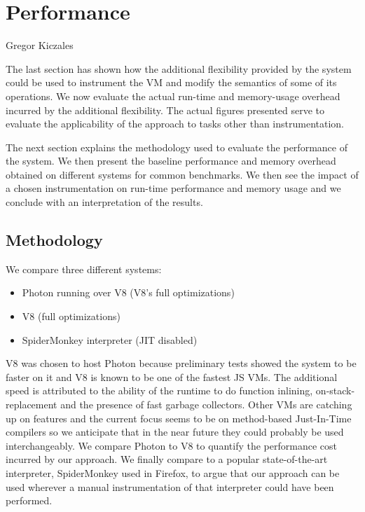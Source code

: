 \chapter{Performance}
{Gregor Kiczales~\cite{Kiczales92towardsa}}

\label{chap:Performance}

The last section has shown how the additional flexibility provided by the
system could be used to instrument the VM and modify the semantics of some of
its operations. We now evaluate the actual run-time and memory-usage overhead
incurred by the additional flexibility. The actual figures presented serve to
evaluate the applicability of the approach to tasks other than instrumentation.

The next section explains the methodology used to evaluate the performance of
the system. We then present the baseline performance and memory overhead
obtained on different systems for common benchmarks. We then see the impact of
a chosen instrumentation on run-time performance and memory usage and we
conclude with an interpretation of the results. 

\section{Methodology}

We compare three different systems:
\begin{itemize}
    \item Photon running over V8 (V8's full optimizations)
    \item V8 (full optimizations)
    \item SpiderMonkey interpreter (JIT disabled)
\end{itemize}

V8 was chosen to host Photon because preliminary tests showed the system to be
faster on it and V8 is known to be one of the fastest JS VMs. The additional
speed is attributed to the ability of the runtime to do function inlining,
on-stack-replacement and the presence of fast garbage collectors. Other VMs are
catching up on features and the current focus seems to be on method-based
Just-In-Time compilers so we anticipate that in the near future they could
probably be used interchangeably. We compare Photon to V8 to quantify the
performance cost incurred by our approach.  We finally compare to a popular
state-of-the-art interpreter, SpiderMonkey used in Firefox, to argue that our
approach can be used wherever a manual instrumentation of that interpreter
could have been performed. 

